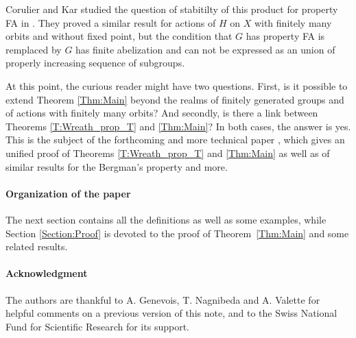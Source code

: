 Corulier and Kar studied the question of stabitilty of this product for property FA in \cite{Cornulier2011}. They proved a similar result for actions of $H$ on $X$ with finitely many orbits and without fixed point, but the condition that $G$ has property FA is remplaced by $G$ has finite abelization and can not be expressed as an union of properly increasing sequence of subgroups. 


At this point, the curious reader might have two questions. First, is it possible to extend Theorem \ref{Thm:Main} beyond the realms of finitely generated groups and of actions with finitely many orbits? And secondly, is there a link between Theorems \ref{T:Wreath_prop_T} and \ref{Thm:Main}?
In both cases, the answer is yes.
This is the subject of the forthcoming and more technical paper \cite{LS2021}, which gives an unified proof of Theorems \ref{T:Wreath_prop_T} and \ref{Thm:Main} as well as of similar results for the Bergman's property and more.
%
%
%
%
\paragraph{Organization of the paper}
The next section contains all the definitions as well as some examples, while Section \ref{Section:Proof} is devoted to the proof of Theorem~\ref{Thm:Main} and some related results.
%
%
%
\paragraph{Acknowledgment}
The authors are thankful to A. Genevois, T. Nagnibeda and A. Valette for helpful comments on a previous version of this note, and to the Swiss National Fund for Scientific Research for its support.
%
%
%

